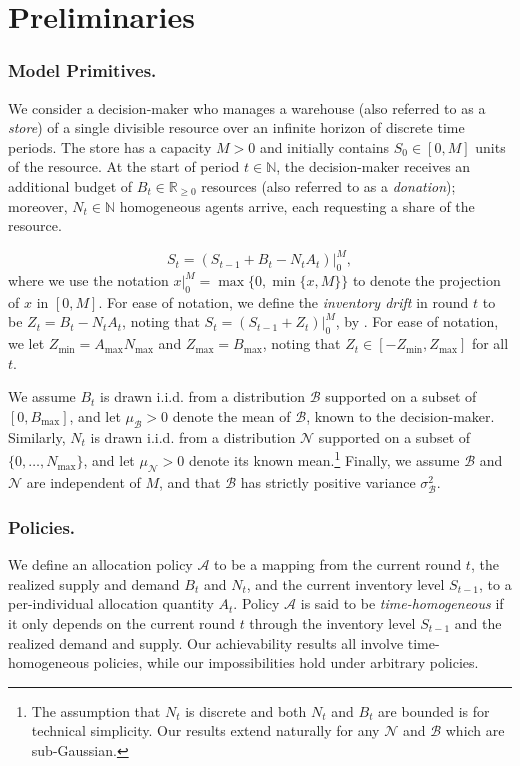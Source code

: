 \documentclass[10pt,a4paper]{amsart}
\theoremstyle{plain}
\theoremstyle{definition}
\theoremstyle{remark}
\newcommand{\N}{\mathbb{N}}
\newcommand{\R}{\mathbb{R}}
\newcommand{\BDist}{\mathcal{B}}
\newcommand{\NDist}{\mathcal{N}}
\newcommand{\Bmean}{\mu_{\BDist}}
\newcommand{\Nmean}{\mu_{\NDist}}
\newcommand{\Bstd}{\sigma_{\BDist}}
\newcommand{\Nmax}{N_{\max}}
\newcommand{\Bmax}{B_{\max}}
\newcommand{\maxAlloc}{A_{\max}}
\renewcommand{\paragraph}[1]{\subsubsection*{#1}}
\begin{document}
\section{Preliminaries}
\label{sec:model}

\paragraph{Model Primitives.} We consider a decision-maker who manages a warehouse (also referred to as a {\em store}) of a single divisible resource over an infinite horizon of discrete time periods.  The store has a capacity $M > 0$ and initially contains $S_0 \in [0,M]$ units of the resource. At the start of period $t \in \N$, the decision-maker receives an additional budget of $B_t \in \R_{\geq 0}$ resources (also referred to as a {\em donation}); moreover, $N_t\in \N$ homogeneous agents arrive, each requesting a share of the resource.

\begin{equation}
\label{eq:state_dynamics}
S_{t} = (S_{t-1} + B_t - N_t A_t)\Big|_0^{M},
\end{equation}
where we use the notation $x|_0^{M} = \max\{0,\min\{x,M\}\}$ to denote the projection of $x$ in $[0,M]$. For ease of notation, we define the {\it inventory drift} in round $t$ to be $Z_t = B_t-N_tA_t$, noting that $S_{t} = \left.(S_{t-1} + Z_t)\right|_0^{M}$, by . For ease of notation, we let $Z_{\min} = \maxAlloc\Nmax$ and $Z_{\max} = \Bmax$, noting that $Z_t \in [-Z_{\min},Z_{\max}]$ for all $t$.


We assume $B_t$ is drawn i.i.d. from a distribution $\BDist$ supported on a subset of $[0, B_{\max}]$, and let $\Bmean {> 0}$ denote the mean of $\BDist$, known to the decision-maker. Similarly, $N_t$ is drawn i.i.d. from a distribution $\NDist$ supported on a subset of $\{0,\ldots,N_{\max}\}$, and let $\Nmean {> 0}$ denote its known mean.\footnote{The assumption that $N_t$ is discrete and both $N_t$ and $B_t$ are bounded is for technical simplicity. Our results extend naturally for any $\NDist$ and $\BDist$ which are sub-Gaussian.} Finally, we assume $\BDist$ and $\NDist$ are independent of $M$, and that $\BDist$ has strictly positive variance $\Bstd^2$.

\paragraph{Policies.} We define an allocation policy $\mathcal{A}$ to be a mapping from the current round $t$, the realized supply and demand $B_t$ and $N_t$, and the current inventory level $S_{t-1}$, to a per-individual allocation quantity $A_t$.
Policy $\mathcal{A}$ is said to be {\it time-homogeneous} if 
it only depends on the current round $t$ through the inventory level $S_{t-1}$ and the realized demand and supply. 
Our achievability results all involve time-homogeneous policies, while our impossibilities hold under arbitrary policies.
\end{document}
